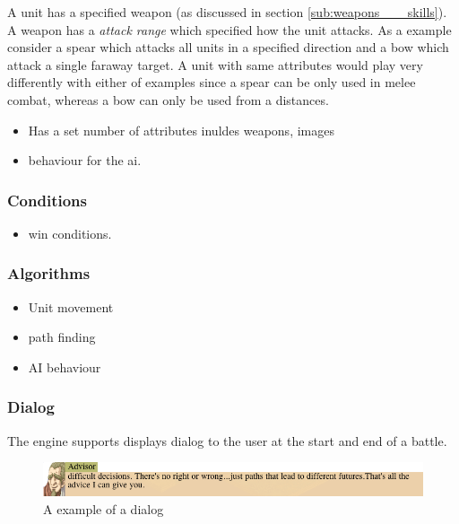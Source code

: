 A unit has a  specified weapon (as discussed in section \ref{sub:weapons___skills}).  A weapon has a \emph{attack range} which specified how the unit attacks.  As a example consider a spear which attacks all units in a specified direction and a bow which attack a single faraway target. A unit with same attributes would  play very differently with either of examples since a spear can be only used in melee combat, whereas a bow can only be used from a distances.

\begin{itemize}
	\item Has a set number of attributes inuldes weapons, images
	\item behaviour for the ai.  
\end{itemize}

\subsubsection{Conditions}
\label{ssub:events}

\begin{itemize}
	\item win conditions.
\end{itemize}

\subsubsection{Algorithms}
\label{ssub:Algorithms}

\begin{itemize}
	\item Unit movement
	\item path finding
	\item AI behaviour
\end{itemize}


\subsubsection{Dialog}
\label{ssub:dialog}
The engine supports displays dialog to the user at the start and end of a battle.

\begin{figure}[htbp]
	\centering
		\includegraphics[width=6.3in]{figures/dialog2.png}
	\caption{A example of a dialog}
	\label{fig:figures_dialog2}
\end{figure}


